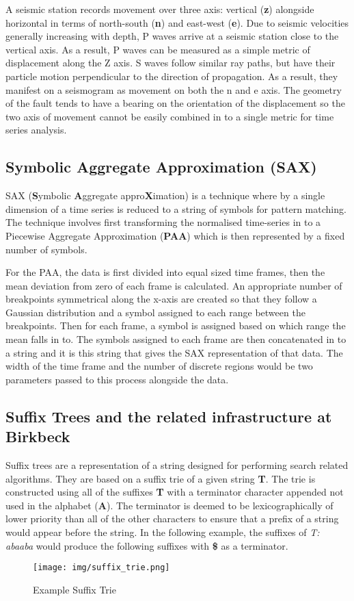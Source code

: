 \documentclass[11pt]{scrartcl}
\begin{document}
	A seismic station records movement over three axis: vertical (\textbf{z}) alongside horizontal in terms of north-south (\textbf{n}) and east-west (\textbf{e}).  Due to seismic velocities generally increasing with depth, P waves arrive at a seismic station close to the vertical axis.  As a result, P waves can be measured as a simple metric of displacement along the Z axis.  S waves follow similar ray paths, but have their particle motion perpendicular to the direction of propagation.  As a result, they manifest on a seismogram as movement on both the n and e axis. The geometry of the fault tends to have a bearing on the orientation of the displacement so the two axis of movement cannot be easily combined in to a single metric for time series analysis.
	
\subsection{Symbolic Aggregate Approximation (SAX)}
	SAX (\textbf{S}ymbolic \textbf{A}ggregate appro\textbf{X}imation) \citep{sax} is a technique where by a single dimension of a time series is reduced to a string of symbols for pattern matching.  The technique involves first transforming the normalised time-series in to a Piecewise Aggregate Approximation (\textbf{PAA}) which is then represented by a fixed number of symbols.
	
	For the PAA, the data is first divided into equal sized time frames, then the mean deviation from zero of each frame is calculated.  An appropriate number of breakpoints symmetrical along the x-axis are created so that they follow a Gaussian distribution and a symbol assigned to each range between the breakpoints.  Then for each frame, a symbol is assigned based on which range the mean falls in to.  The symbols assigned to each frame are then concatenated in to a string and it is this string that gives the SAX representation of that data.  The width of the time frame and the number of discrete regions would be two parameters passed to this process alongside the data.
	
\subsection{Suffix Trees and the related infrastructure at Birkbeck}
	Suffix trees \citep{suffix} are a representation of a string designed for performing search related algorithms.  They are based on a suffix trie of a given string \textbf{T}.  The trie is constructed using all of the suffixes \textbf{T} with a terminator character appended not used in the alphabet (\textbf{A}).  The terminator is deemed to be lexicographically of lower priority than all of the other characters to ensure that a prefix of a string would appear before the string. In the following example, the suffixes of \textit{T: abaaba} would produce the following suffixes with \textbf{\$} as a terminator.
	\begin{figure}[h]
		\centering
		\texttt{[image: img/suffix\_trie.png]}
		\caption{Example Suffix Trie}
	\end{figure}
	
\end{document}
